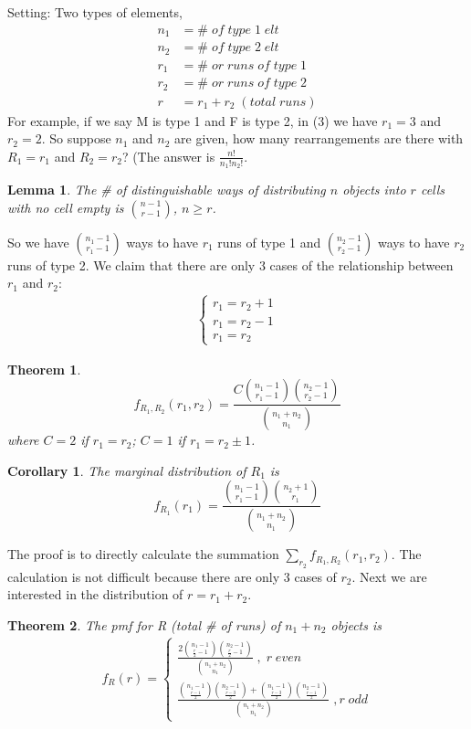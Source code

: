 \documentclass[twoside]{article}
\newtheorem*{theorem*}{Theorem}
\newtheorem*{corollary*}{Corollary}
\newtheorem*{lemma*}{Lemma}
\begin{document}
	Setting: Two types of elements, 
	\begin{align*}
		n_1 &= \# \; of \; type \; 1 \; elt \\
		n_2 &= \# \; of \; type \; 2 \; elt \\
		r_1 &= \# \; or \; runs \; of \; type \; 1 \\
		r_2 &= \# \; or \; runs \; of \; type \; 2 \\
		r &= r_1 + r_2 \; (total \; runs)
	\end{align*}
	For example, if we say M is type 1 and F is type 2, in (3) we have $r_1 = 3$ and $r_2 = 2$. So suppose $n_1$ and $n_2$ are given, how many rearrangements are there with $R_1 = r_1$ and $R_2 = r_2$? (The answer is $\frac{n!}{n_1 ! n_2 !}$. 
	\begin{lemma*}
		The \# of distinguishable ways of distributing $n$ objects into $r$ cells with no cell empty is $\binom{n-1}{r-1}$, $n \geqslant r$.
	\end{lemma*}
	So we have $\binom{n_1 - 1}{r_1 - 1}$ ways to have $r_1$ runs of type 1 and $\binom{n_2 - 1}{r_2 - 1}$ ways to have $r_2$ runs of type 2. We claim that there are only 3 cases of the relationship between $r_1$ and $r_2$: 
	\begin{align*}
		\begin{cases}
			r_1 = r_2 + 1 \\
			r_1 = r_2 - 1 \\
			r_1 = r_2
		\end{cases}
	\end{align*}
	\begin{theorem*}
		$$
		f_{R_1, R_2}(r_1, r_2) = \frac{C \binom{n_1 - 1}{r_1 - 1} \binom{n_2 - 1}{r_2 - 1}}{\binom{n_1 + n_2}{n_1}}
		$$
		where $C=2$ if $r_1 = r_2$; $C=1$ if $r_1 = r_2 \pm 1$.
	\end{theorem*}
	\begin{corollary*}
		The marginal distribution of $R_1$ is 
		$$
		f_{R_1} (r_1) = \frac{\binom{n_1 - 1}{r_1 - 1} \binom{n_2 + 1}{r_1}}{\binom{n_1 + n_2}{n_1}}
		$$
	\end{corollary*}
	The proof is to directly calculate the summation $\sum_{r_2}f_{R_1, R_2}(r_1, r_2)$. The calculation is not difficult because there are only 3 cases of $r_2$. Next we are interested in the distribution of $r = r_1 + r_2$. 
	\begin{theorem*}
		The pmf for R (total \# of runs) of $n_1 + n_2$ objects is 
		\begin{align*}
			f_R (r) = 
			\begin{cases}
				\frac{2 \binom{n_1 - 1}{\frac{r}{2} - 1} \binom{n_2 - 1}{{\frac{r}{2} - 1}}}{\binom{n_1+n_2}{n_1}} \; , \; r \; even \\
				\frac{\binom{n_1 - 1}{\frac{r - 1}{2}} \binom{n_2 - 1}{\frac{r-3}{2}} + \binom{n_1 - 1}{\frac{r-3}{2}} \binom{n_2 - 1}{\frac{r-1}{2}}}{\binom{n_1+n_2}{n_1}} \; , r\; odd
			\end{cases}
		\end{align*}
	\end{theorem*}
\end{document}
